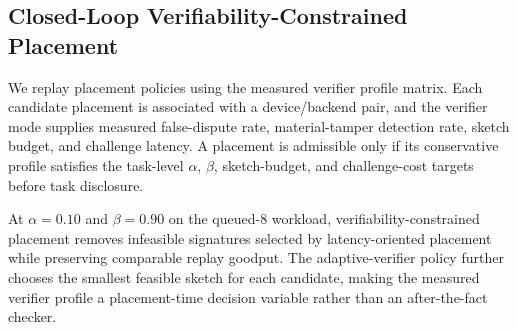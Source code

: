 \subsection{Closed-Loop Verifiability-Constrained Placement}
\label{subsec:eval-vc-placement}

We replay placement policies using the measured verifier profile matrix. Each candidate placement is associated with a device/backend pair, and the verifier mode supplies measured false-dispute rate, material-tamper detection rate, sketch budget, and challenge latency. A placement is admissible only if its conservative profile satisfies the task-level $\alpha$, $\beta$, sketch-budget, and challenge-cost targets before task disclosure.

At $\alpha=0.10$ and $\beta=0.90$ on the queued-8 workload, verifiability-constrained placement removes infeasible signatures selected by latency-oriented placement while preserving comparable replay goodput. The adaptive-verifier policy further chooses the smallest feasible sketch for each candidate, making the measured verifier profile a placement-time decision variable rather than an after-the-fact checker.

